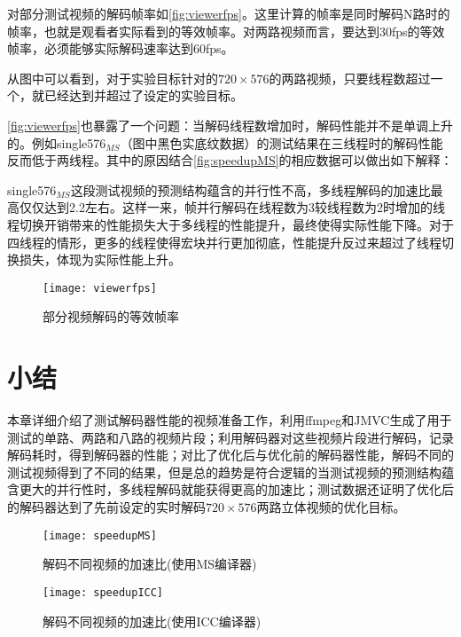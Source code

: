 对部分测试视频的解码帧率如\autoref{fig:viewerfps}。这里计算的帧率是同时解码N路时的帧率，也就是观看者实际看到的等效帧率。对两路视频而言，要达到30fps的等效帧率，必须能够实际解码速率达到60fps。

从图中可以看到，对于实验目标针对的$720\times 576$的两路视频，只要线程数超过一个，就已经达到并超过了设定的实验目标。

\autoref{fig:viewerfps}也暴露了一个问题：当解码线程数增加时，解码性能并不是单调上升的。例如single576$_{MS}$（图中黑色实底纹数据）的测试结果在三线程时的解码性能反而低于两线程。其中的原因结合\autoref{fig:speedupMS}的相应数据可以做出如下解释：

single576$_{MS}$这段测试视频的预测结构蕴含的并行性不高，多线程解码的加速比最高仅仅达到2.2左右。这样一来，帧并行解码在线程数为3较线程数为2时增加的线程切换开销带来的性能损失大于多线程的性能提升，最终使得实际性能下降。对于四线程的情形，更多的线程使得宏块并行更加彻底，性能提升反过来超过了线程切换损失，体现为实际性能上升。

\begin{figure}[htbp]
\begin{center}
\texttt{[image: viewerfps]}
\caption{部分视频解码的等效帧率}
\label{fig:viewerfps}
\end{center}
\end{figure}

\section{小结}
\label{sec:sum6}

本章详细介绍了测试解码器性能的视频准备工作，利用ffmpeg和JMVC生成了用于测试的单路、两路和八路的视频片段；利用解码器对这些视频片段进行解码，记录解码耗时，得到解码器的性能；对比了优化后与优化前的解码器性能，解码不同的测试视频得到了不同的结果，但是总的趋势是符合逻辑的{\pozhehao}当测试视频的预测结构蕴含更大的并行性时，多线程解码就能获得更高的加速比；测试数据还证明了优化后的解码器达到了先前设定的实时解码$720\times576$两路立体视频的优化目标。


\begin{figure}[htbp]
\begin{center}
\texttt{[image: speedupMS]}
\caption{解码不同视频的加速比(使用MS编译器)}
\label{fig:speedupMS2}
\end{center}
\end{figure}


\begin{figure}[htbp]
\begin{center}
\texttt{[image: speedupICC]}
\caption{解码不同视频的加速比(使用ICC编译器)}
\label{fig:speedupICC2}
\end{center}
\end{figure}


\cleardoublepage